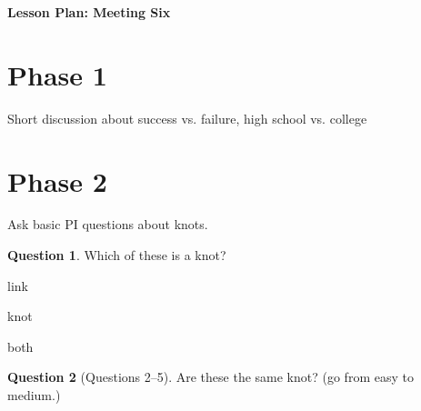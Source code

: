 \documentclass[12pt]{amsart}
\theoremstyle{definition}
\newtheorem{question}{Question}
\begin{document}
\begin{center}
\textbf{\Huge
Lesson Plan: Meeting Six
}
\end{center}
\vspace{.5in}

\section*{Phase 1}
Short discussion about success vs. failure, high school vs. college

\section*{Phase 2} 
Ask basic PI questions about knots.

\begin{question} 
Which of these is a knot?
\begin{compactitem}
    \item link
    \item knot
    \item both
\end{compactitem}
\end{question}

\begin{question}[Questions 2--5] 
Are these the same knot?
(go from easy to medium.)
\end{question}
\end{document}
